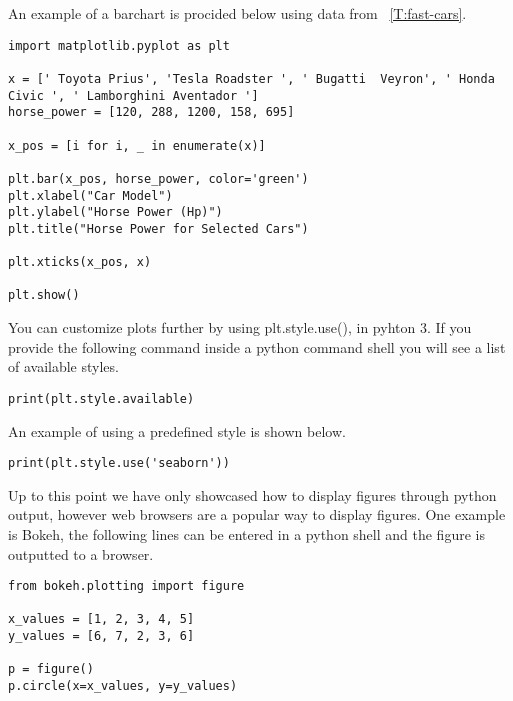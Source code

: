 An example of a barchart is procided below using data from
~\ref{T:fast-cars}. 

\begin{lstlisting}
import matplotlib.pyplot as plt

x = [' Toyota Prius', 'Tesla Roadster ', ' Bugatti  Veyron', ' Honda Civic ', ' Lamborghini Aventador ']
horse_power = [120, 288, 1200, 158, 695]

x_pos = [i for i, _ in enumerate(x)]

plt.bar(x_pos, horse_power, color='green')
plt.xlabel("Car Model")
plt.ylabel("Horse Power (Hp)")
plt.title("Horse Power for Selected Cars")

plt.xticks(x_pos, x)

plt.show()
\end{lstlisting}

You can customize plots further by using plt.style.use(), in pyhton
3. If you provide the following command inside a python command shell
you will see a list of available styles.

\begin{lstlisting}
print(plt.style.available)
\end{lstlisting}
 
An example of using a predefined style is shown below. 

\begin{lstlisting}
print(plt.style.use('seaborn'))
\end{lstlisting}

Up to this point we have only showcased how to display figures through
python output, however web browsers are a popular way to display
figures. One example is Bokeh, the following lines can be entered in a
python shell and the figure is outputted to a browser. 

\begin{lstlisting}
from bokeh.plotting import figure

x_values = [1, 2, 3, 4, 5]
y_values = [6, 7, 2, 3, 6]

p = figure()
p.circle(x=x_values, y=y_values)
\end{lstlisting}
